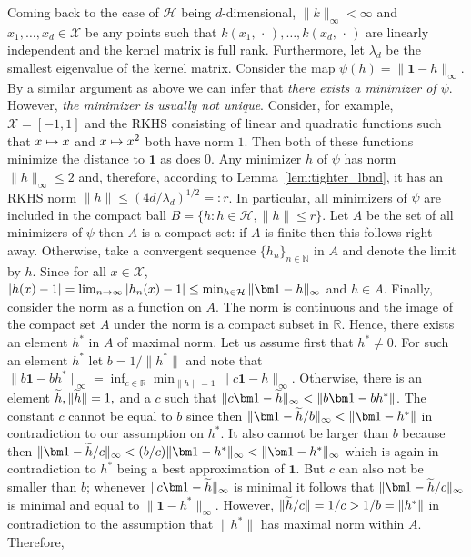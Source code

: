 \documentclass[AHL,Unicode,longabstracts,published]{cedram}
\theoremstyle{remark}
\newcommand{\R}{\mathbb{R}}
\newcommand{\bbN}{\mathbb{N}}
\newcommand{\X}{\mathcal{X}}
\newcommand{\cH}{\mathcal{H}}
\let\oldtilde\tilde
\renewcommand*{\tilde}[1]{\mathchoice{\widetilde{#1}}{\widetilde{#1}}{\oldtilde{#1}}{\oldtilde{#1}}}
\renewcommand*{\to}{\mathchoice{\longrightarrow}{\rightarrow}{\rightarrow}{\rightarrow}}
\let\oldmapsto\mapsto
\renewcommand*{\mapsto}{\mathchoice{\longmapsto}{\oldmapsto}{\oldmapsto}{\oldmapsto}}
\begin{document}
Coming back to the case of $\cH$ being $d$-dimensional, $\|k\|_\infty < \infty$ and $x_1,\dots,x_d \in \X$ be any points such that $k(x_1,\,\cdot\,),\dots, k(x_d,\,\cdot\,)$ are linearly independent and the kernel matrix is full rank. Furthermore, let $\lambda_d$ be the smallest eigenvalue of the kernel matrix. Consider the map $\psi(h) = \|\bm 1 - h\|_\infty$. By a similar argument as above we can infer that \emph{there exists a minimizer of $\psi$}. However, \emph{the minimizer is usually not unique}. Consider, for example, $\X = [-1,1]$ and the RKHS consisting of linear and quadratic functions such that $x\mapsto x$ and $x\mapsto x^2$ both have norm $1$. Then both of these functions minimize the distance to $\bm 1$ as does $0$. Any minimizer $h$ of $\psi$ has norm $\|h\|_\infty \leq 2$ and, therefore, according to Lemma~\ref{lem:tighter_lbnd}, it has an RKHS norm $\|h\| \leq (4d/\lambda_d)^{1/2} =: r$. In particular, all minimizers of $\psi$ are included in the compact ball $B = \{ h : h \in \cH, \|h \| \leq r\}$. Let $A$ be the set of all minimizers of $\psi$ then $A$ is a compact set: if $A$ is finite then this follows right away. Otherwise, take a convergent sequence $\{h_n\}_{n\in \bbN}$ in $A$ and denote the limit by $h$. Since for all $x\in \X$, $|h(x) - 1| = \lim_{n\to \infty} |h_n(x) -1| \leq \min_{h\in \cH} \|\bm 1 -h \|_\infty$ and $h \in A$. Finally, consider the norm as a function on $A$. The norm is continuous and the image of the compact set $A$ under the norm is a compact subset in $\R$. Hence, there exists an element $h^*$ in $A$ of maximal norm. Let us assume first that $h^*\not = 0$. For such an element $h^*$ let $b = 1/\|h^*\|$ and note that$\|b \bm 1 - b h^*\|_\infty = \inf_{c \in \R} \min_{\|h\|=1} \|c \bm 1 - h\|_\infty$. Otherwise, there is an element $\tilde h, \|\tilde h\|=1,$ and a $c$ such that $\|c \bm 1 - \tilde h\|_\infty < \| b \bm 1 - b h^*\|$. The constant $c$ cannot be equal to $b$ since then $\|\bm 1 - \tilde h/b \|_\infty < \| \bm 1 - h^*\|$ in contradiction to our assumption on $h^*$. It also cannot be larger than $b$ because then $\|\bm 1 - \tilde h /c \|_\infty < (b/c) \|\bm 1- h^*\|_\infty < \|\bm 1 -h^*\|_\infty$ which is again in contradiction to $h^*$ being a best approximation of $\bm 1$. But $c$ can also not be smaller than $b$; whenever $\|c \bm 1 - \tilde h\|_\infty$ is minimal it follows that $\|\bm 1 - \tilde h/c\|_\infty$ is minimal and equal to $\|\bm 1 - h^*\|_\infty$. However, $\|\tilde h / c \| = 1/c > 1/b = \|h^*\|$ in contradiction to the assumption that $\|h^*\|$ has maximal norm within $A$. Therefore,
\end{document}
